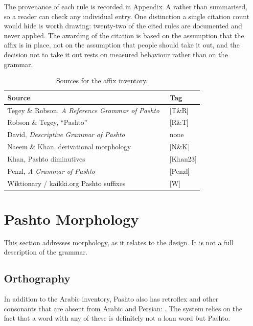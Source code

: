 \documentclass[conference]{IEEEtran}
\newcommand{\ps}[1]{{\pashtofont\textpashto{#1}}}
\begin{document}
The provenance of each rule is recorded in Appendix~A rather than summarised,
so a reader can check any individual entry. One distinction a single citation
count would hide is worth drawing: twenty-two of the cited rules are documented
and never applied. The awarding of the citation is based on the assumption that the affix is in
place, not on the assumption that people should take it out, and the decision
not to take it out rests on measured behaviour rather than on the grammar.

\begin{table}[t]
\caption{Sources for the affix inventory.}
\label{tab:sources}
\centering
\begin{tabular}{p{4.4cm}l}
\toprule
Source & Tag\\
\midrule
Tegey \& Robson, \emph{A Reference Grammar of Pashto}~\cite{tegey1996} & [T\&R]\\
Robson \& Tegey, ``Pashto''~\cite{robson2009} & [R\&T]\\
David, \emph{Descriptive Grammar of Pashto}~\cite{david2014} & none\\
Naeem \& Khan, derivational morphology~\cite{naeem} & [N\&K]\\
Khan, Pashto diminutives~\cite{khan2023} & [Khan23]\\
Penzl, \emph{A Grammar of Pashto}~\cite{penzl1955} & [Penzl]\\
Wiktionary / kaikki.org Pashto suffixes & [W]\\
\bottomrule
\end{tabular}
\end{table}

\section{Pashto Morphology}

This section addresses morphology, as it relates to the design. It is not a
full description of the grammar.

\subsection{Orthography}

In addition to the Arabic inventory, Pashto also has retroflex and other
consonants that are absent from Arabic and Persian: \ps{ټ ډ ړ ږ ښ ځ څ ڼ ګ}. The
system relies on the fact that a word with any of these is definitely not a
loan word but Pashto.
\end{document}
